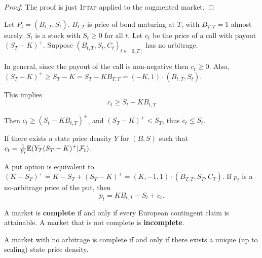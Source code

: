 \begin{proof}
  The proof is just \textsc{1ftap} applied to the augmented market.
\end{proof}

\begin{exmp}
  \label{defn:discrete_time_models:24}
  Let $P_{t} = (B_{t, T}, S_{t})$.  $B_{t, T}$ is price of bond
  maturing at $T$, with $B_{T, T} = 1$ almost surely.  $S_{t}$ is a
  stock with $S_{t} \geq 0$ for all $t$.  Let $c_{t}$ be the price of
  a call with payout $(S_{T} - K)^{+}$.  Suppose $(B_{t, T}, S_{t},
  C_{t})_{t \in [0, T]}$ has no arbitrage.

  In general, since the payout of the call is non-negative then $c_{t}
  \geq 0$.  Also, $(S_{T} - K)^{+} \geq S_{T} - K = S_{T} - K B_{T, T}
  = (-K, 1) \cdot (B_{t, T}, S_{t})$.

  This implies
  \begin{equation}
    \label{eq:23}
    c_{t} \geq S_{t} - K B_{t, T}
  \end{equation}

  Then $c_{t} \geq (S_{t} - KB_{t, T})^{+}$, and $(S_{T} - K)^{+} <
  S_{T}$, thus $c_{t} \leq S_{t}$.

  If there exists a state price density $Y$ for $(B, S)$ such that
  $c_{t} = \frac{1}{Y_{t}} \E{Y_{T}(S_{T} - K)^{+} |
    \mathcal{F}_{t}}$.
\end{exmp}

\begin{exmp}
  \label{defn:discrete_time_models:25}
  A put option is equivalent to $(K - S_{T})^{+} = K - S_{T} + (S_{T}
  - K)^{+} = (K, -1, 1) \cdot (B_{T, T}, S_{T}, C_{T})$.  If $p_{t}$
  is a no-arbitrage price of the put, then
  \begin{equation}
    \label{eq:24}
    p_{t} = K B_{t, T} - S_{t} + c_{t}.
  \end{equation}
\end{exmp}

\begin{defn}
  \label{defn:discrete_time_models:26}
  A market is \textbf{complete} if and only if every European
  contingent claim is attainable. A market that is not complete is
  \textbf{incomplete}.
\end{defn}

\begin{thm}
  \label{defn:discrete_time_models:27}
  A market with no arbitrage is complete if and only if there exists a
  unique (up to scaling) state price density.
\end{thm}

